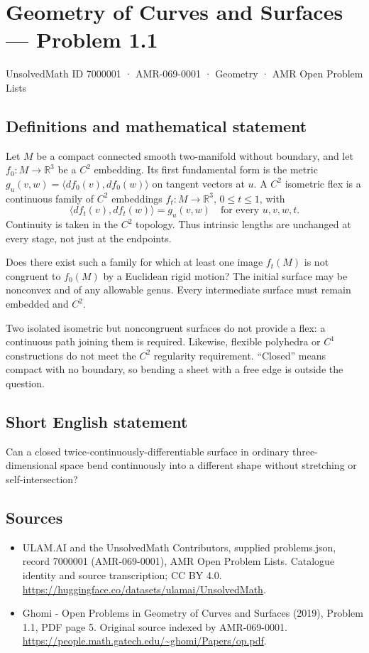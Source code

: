 \documentclass[11pt,a4paper]{article}
\begin{document}
\section*{Geometry of Curves and Surfaces — Problem 1.1}\label{7000001}
{\small UnsolvedMath ID 7000001 · AMR-069-0001 · Geometry · AMR Open Problem Lists}
\subsection{Definitions and mathematical statement}
Let $M$ be a compact connected smooth two-manifold without boundary,
and let $f_0:M\to\mathbb R^3$ be a $C^2$ embedding. Its first
fundamental form is the metric
$g_u(v,w)=\langle df_0(v),df_0(w)\rangle$ on tangent vectors at $u$.
A $C^2$ isometric flex is a continuous family of $C^2$ embeddings
$f_t:M\to\mathbb R^3$, $0\le t\le1$, with
\[
       \langle df_t(v),df_t(w)\rangle=g_u(v,w)
       \quad\text{for every }u,v,w,t.
\]
Continuity is taken in the $C^2$ topology. Thus intrinsic lengths
are unchanged at every stage, not just at the endpoints.

Does there exist such a family for which at least one image
$f_t(M)$ is not congruent to $f_0(M)$ by a Euclidean rigid motion?
The initial surface may be nonconvex and of any allowable genus.
Every intermediate surface must remain embedded and $C^2$.

Two isolated isometric but noncongruent surfaces do not provide a
flex: a continuous path joining them is required. Likewise,
flexible polyhedra or $C^1$ constructions do not meet the $C^2$
regularity requirement. ``Closed'' means compact with no boundary,
so bending a sheet with a free edge is outside the question.
\subsection{Short English statement}
Can a closed twice-continuously-differentiable surface in ordinary
three-dimensional space bend continuously into a different shape
without stretching or self-intersection?
\subsection{Sources}
\begin{itemize}
\item[S1] ULAM.AI and the UnsolvedMath Contributors, supplied problems.json, record 7000001 (AMR-069-0001), AMR Open Problem Lists. Catalogue identity and source transcription; CC BY 4.0.
\url{https://huggingface.co/datasets/ulamai/UnsolvedMath}.
\item[S2] Ghomi - Open Problems in Geometry of Curves and Surfaces (2019), Problem 1.1, PDF page 5. Original source indexed by AMR-069-0001.
\url{https://people.math.gatech.edu/~ghomi/Papers/op.pdf}.
\end{itemize}
\end{document}
